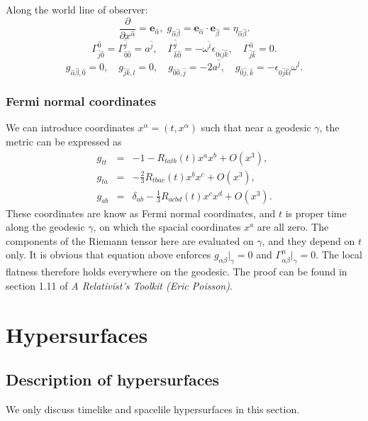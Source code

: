 \noindent
Along the world line of observer:
\[\frac{\partial}{\partial x^{\hat{\alpha}}} = \bm{e}_{\hat{\alpha}}, \;g_{\hat{\alpha} \hat{\beta}} = \bm{e}_{\hat{\alpha}} \cdot \bm{e}_{\hat{\beta}} = \eta_{\hat{\alpha}\hat{\beta}}.\]
\[\Gamma^{\hat{0}}_{\hat{j} \hat{0}} = \Gamma^{\hat{j}}_{\hat{0} \hat{0}} = a^{\hat{j}}
, \quad \Gamma^{\hat{j}}_{\hat{k} \hat{0}} = -\omega^{\hat{i}} \epsilon_{0 \hat{i} \hat{j} \hat{k}}, \quad \Gamma^{\hat{\alpha}}_{\hat{j} \hat{k}} = 0 .\]
\[g_{\hat{\alpha} \hat{\beta},\hat{0}} = 0, \quad g_{\hat{j} \hat{k},\hat{l}} = 0, \quad
g_{\hat{0} \hat{0},\hat{j}} = -2 a^{\hat{j}}, \quad 
g_{\hat{0} \hat{j},\hat{k}} = -\epsilon_{0 \hat{j} \hat{k} \hat{l}} \omega^{\hat{l}}
.\]

\subsubsection{Fermi normal coordinates}
We can introduce coordinates $x^{\alpha} = (t,x^{\alpha})$ such that near a geodesic $\gamma$, the metric can be expressed as
\begin{eqnarray}
g_{tt} &=& -1 - R_{tatb}(t)x^a x^b + O(x^3), \nonumber \\
g_{ta} &=&  - \frac{2}{3} R_{tbac}(t)x^b x^c + O(x^3), \nonumber \\
g_{ab} &=& \delta_{ab} - \frac{1}{3} R_{acbd}(t)x^c x^d + O(x^3). \nonumber
\end{eqnarray}
These coordinates are know as Fermi normal coordinates, and $t$ is proper time along the geodesic $\gamma$, on which the spacial coordinates $x^a$ are all zero. The components of the Riemann tensor here are evaluated on $\gamma$, and they depend on $t$ only. It is obvious that equation above enforces $g_{\alpha\beta}|_{\gamma} = 0$ and $\Gamma^{\mu}_{\alpha\beta} |_{\gamma} = 0$. The local flatness therefore holds everywhere on the geodesic.  The proof can be found in section 1.11 of \emph{A Relativist's Toolkit (Eric Poisson)}.

\section{Hypersurfaces}
\subsection{Description of hypersurfaces}
\begin{note}
We only discuss timelike and spacelile hypersurfaces in this section.
\end{note}
